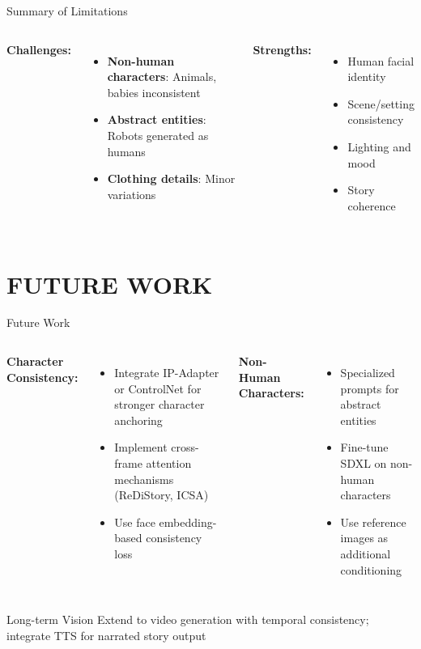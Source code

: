 \documentclass{beamer}
\begin{document}
\begin{frame}{Summary of Limitations}
    \begin{columns}
        \footnotesize
        \textbf{Challenges:}
        \begin{itemize}
            \item \textbf{Non-human characters}: Animals, babies inconsistent
            \item \textbf{Abstract entities}: Robots generated as humans
            \item \textbf{Clothing details}: Minor variations
        \end{itemize}
        \footnotesize
        \textbf{Strengths:}
        \begin{itemize}
            \item \checkmark Human facial identity
            \item \checkmark Scene/setting consistency
            \item \checkmark Lighting and mood
            \item \checkmark Story coherence
        \end{itemize}
    \end{columns}
\end{frame}

\section{FUTURE WORK}
\begin{frame}{Future Work}
    \begin{columns}
        \footnotesize
        \textbf{Character Consistency:}
        \begin{itemize}
            \item Integrate IP-Adapter or ControlNet for stronger character anchoring
            \item Implement cross-frame attention mechanisms (ReDiStory, ICSA)
            \item Use face embedding-based consistency loss
        \end{itemize}
        \footnotesize
        \textbf{Non-Human Characters:}
        \begin{itemize}
            \item Specialized prompts for abstract entities
            \item Fine-tune SDXL on non-human characters
            \item Use reference images as additional conditioning
        \end{itemize}
    \end{columns}
    \vspace{1em}
    \begin{block}{Long-term Vision}
        \footnotesize
        Extend to video generation with temporal consistency; integrate TTS for narrated story output
    \end{block}
\end{frame}
\end{document}

